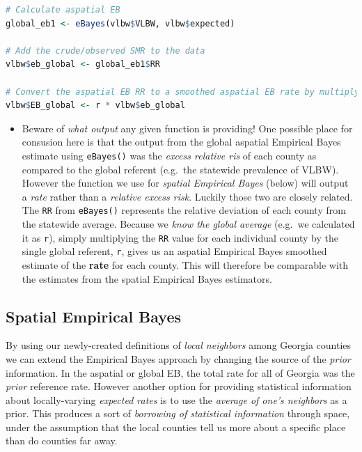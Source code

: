 \documentclass[
]{book}
\newcommand{\passthrough}[1]{#1}
\newenvironment{rmdblock}[1]
  {%
  \begin{itemize}
  \renewcommand{\labelitemi}{
    \raisebox{-.7\height}[0pt][0pt]{
      {\setkeys{Gin}{width=3em,keepaspectratio}\texttt{[image: images/\#1]}}
    }
  }
  \item
  }
  {
  \end{itemize}
  }
\newenvironment{rmdcaution}
  {\begin{rmdblock}{caution}}
  {\end{rmdblock}}
\begin{document}
\begin{lstlisting}[language=R]
# Calculate aspatial EB
global_eb1 <- eBayes(vlbw$VLBW, vlbw$expected)

# Add the crude/observed SMR to the data
vlbw$eb_global <- global_eb1$RR

# Convert the aspatial EB RR to a smoothed aspatial EB rate by multiplying by referent rate, r
vlbw$EB_global <- r * vlbw$eb_global
\end{lstlisting}

\begin{rmdcaution}
Beware of \emph{what output} any given function is providing! One possible place for consusion here is that the output from the global aspatial Empirical Bayes estimate using \passthrough{\lstinline!eBayes()!} was the \emph{excess relative ris} of each county as compared to the global referent (e.g.~the statewide prevalence of VLBW). However the function we use for \emph{spatial Empirical Bayes} (below) will output a \emph{rate} rather than a \emph{relative excess risk}. Luckily those two are closely related. The \passthrough{\lstinline!RR!} from \passthrough{\lstinline!eBayes()!} represents the relative deviation of each county from the statewide average. Because we \emph{know the global average} (e.g.~we calculated it as \passthrough{\lstinline!r!}), simply multiplying the \passthrough{\lstinline!RR!} value for each individual county by the single global referent, \passthrough{\lstinline!r!}, gives us an aspatial Empirical Bayes smoothed estimate of the \textbf{rate} for each county. This will therefore be comparable with the estimates from the spatial Empirical Bayes estimators.
\end{rmdcaution}

\hypertarget{spatial-empirical-bayes}{%
\subsection{Spatial Empirical Bayes}\label{spatial-empirical-bayes}}

By using our newly-created definitions of \emph{local neighbors} among Georgia counties we can extend the Empirical Bayes approach by changing the source of the \emph{prior} information. In the aspatial or global EB, the total rate for all of Georgia was the \emph{prior} reference rate. However another option for providing statistical information about locally-varying \emph{expected rates} is to use the \emph{average of one's neighbors} as a prior. This produces a sort of \emph{borrowing of statistical information} through space, under the assumption that the local counties tell us more about a specific place than do counties far away.
\end{document}

